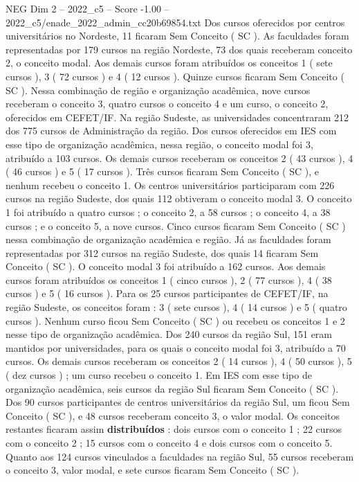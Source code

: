 \begin{textsample}{NEG Dim 2 – 2022\_c5 – Score -1.00 – 2022\_c5/enade\_2022\_admin\_cc20b69854.txt}
Dos cursos oferecidos por centros universitários no Nordeste, 11 ficaram Sem Conceito ( SC ).
As faculdades foram representadas por 179 cursos na região Nordeste, 73 dos quais receberam conceito 2, o conceito modal.
Aos demais cursos foram atribuídos os conceitos 1 ( sete cursos ), 3 ( 72 cursos ) e 4 ( 12 cursos ).
Quinze cursos ficaram Sem Conceito ( SC ).
Nessa combinação de região e organização acadêmica, nove cursos receberam o conceito 3, quatro cursos o conceito 4 e um curso, o conceito 2, oferecidos em CEFET/IF.
Na região Sudeste, as universidades concentraram 212 dos 775 cursos de Administração da região.
Dos cursos oferecidos em IES com esse tipo de organização acadêmica, nessa região, o conceito modal foi 3, atribuído a 103 cursos.
Os demais cursos receberam os conceitos 2 ( 43 cursos ), 4 ( 46 cursos ) e 5 ( 17 cursos ).
Três cursos ficaram Sem Conceito ( SC ), e nenhum recebeu o conceito 1.
Os centros universitários participaram com 226 cursos na região Sudeste, dos quais 112 obtiveram o conceito modal 3.
O conceito 1 foi atribuído a quatro cursos ; o conceito 2, a 58 cursos ; o conceito 4, a 38 cursos ; e o conceito 5, a nove cursos.
Cinco cursos ficaram Sem Conceito ( SC ) nessa combinação de organização acadêmica e região.
Já as faculdades foram representadas por 312 cursos na região Sudeste, dos quais 14 ficaram Sem Conceito ( SC ).
O conceito modal 3 foi atribuído a 162 cursos.
Aos demais cursos foram atribuídos os conceitos 1 ( cinco cursos ), 2 ( 77 cursos ), 4 ( 38 cursos ) e 5 ( 16 cursos ).
Para os 25 cursos participantes de CEFET/IF, na região Sudeste, os conceitos foram : 3 ( sete cursos ), 4 ( 14 cursos ) e 5 ( quatro cursos ).
Nenhum curso ficou Sem Conceito ( SC ) ou recebeu os conceitos 1 e 2 nesse tipo de organização acadêmica.
Dos 240 cursos da região Sul, 151 eram mantidos por universidades, para os quais o conceito modal foi 3, atribuído a 70 cursos.
Os demais cursos receberam os conceitos 2 ( 14 cursos ), 4 ( 50 cursos ), 5 ( dez cursos ) ; um curso recebeu o conceito 1.
Em IES com esse tipo de organização acadêmica, seis cursos da região Sul ficaram Sem Conceito ( SC ).
Dos 90 cursos participantes de centros universitários da região Sul, um ficou Sem Conceito ( SC ), e 48 cursos receberam conceito 3, o valor modal.
Os conceitos restantes ficaram assim \textbf{distribuídos} : dois cursos com o conceito 1 ; 22 cursos com o conceito 2 ; 15 cursos com o conceito 4 e dois cursos com o conceito 5.
Quanto aos 124 cursos vinculados a faculdades na região Sul, 55 cursos receberam o conceito 3, valor modal, e sete cursos ficaram Sem Conceito ( SC ).

\end{textsample}
